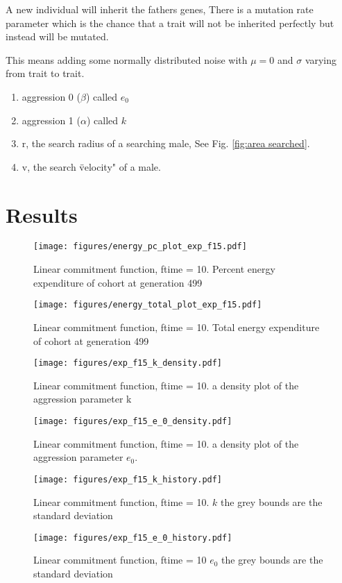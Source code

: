 \documentclass[a4paper,11pt]{article}
\begin{document}
A new individual will inherit the fathers genes,
There is a mutation rate parameter which is the chance that a trait will not be inherited perfectly but instead will be mutated.

This means adding some normally distributed noise with $\mu = 0$ and $\sigma$ varying from trait to trait.

\begin{enumerate}
    \item aggression 0 ($\beta$) called $e_0$
    \item aggression 1 ($\alpha$) called $k$
    
    \item r, the search radius of a searching male, See Fig. \ref{fig:area searched}.
    \item v, the search \"velocity" of a male.
\end{enumerate}

\clearpage

\section{Results} %
\label{sec:results}
\begin{figure}[h!]
    \centering
    \texttt{[image: figures/energy\_pc\_plot\_exp\_f15.pdf]}
    \caption{Linear commitment function, ftime = 10. Percent energy expenditure of cohort at generation 499}
    \label{fig:var energy pc}
    \centering

    \texttt{[image: figures/energy\_total\_plot\_exp\_f15.pdf]}
    \caption{Linear commitment function, ftime = 10. Total energy expenditure of cohort at generation 499}
    \label{fig:var energy total}
\end{figure}

\begin{figure}[h!]
    \centering
    \texttt{[image: figures/exp\_f15\_k\_density.pdf]}
    \caption{Linear commitment function, ftime = 10. a density plot of the aggression parameter k}
    \label{fig:k density}

    \texttt{[image: figures/exp\_f15\_e\_0\_density.pdf]}
    \caption{Linear commitment function, ftime = 10. a density plot of the aggression parameter $e_0$.}
    \label{fig:e_0 density}
\end{figure}

\begin{figure}[h!]
    \centering
    \texttt{[image: figures/exp\_f15\_k\_history.pdf]}
    \caption{Linear commitment function, ftime = 10. $k$ the grey bounds are the standard deviation}

    \texttt{[image: figures/exp\_f15\_e\_0\_history.pdf]}
    \caption{Linear commitment function, ftime = 10 $e_0$ the grey bounds are the standard deviation}
\end{figure}
\end{document}
